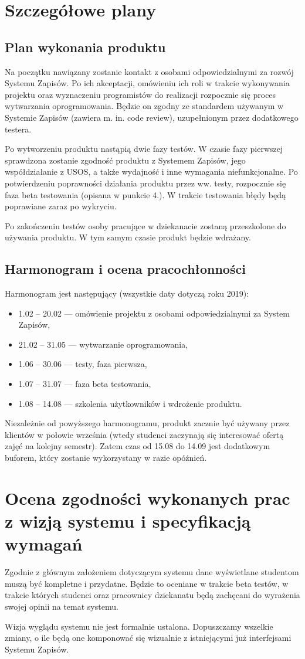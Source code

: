 \documentclass{article}
\begin{document}
\section{Szczegółowe plany}
\subsection{Plan wykonania produktu}
Na początku nawiązany zostanie kontakt z osobami odpowiedzialnymi za rozwój Systemu Zapisów.
Po ich akceptacji, omówieniu ich roli w trakcie wykonywania projektu oraz wyznaczeniu programistów do realizacji rozpocznie się proces wytwarzania oprogramowania.
Będzie on zgodny ze standardem używanym w Systemie Zapisów (zawiera m. in. code review), uzupełnionym przez dodatkowego testera.

Po wytworzeniu produktu nastąpią dwie fazy testów.
W czasie fazy pierwszej sprawdzona zostanie zgodność produktu z Systemem Zapisów, jego współdziałanie z USOS, a także wydajność i inne wymagania niefunkcjonalne.
Po potwierdzeniu poprawności działania produktu przez ww. testy, rozpocznie się faza beta testowania (opisana w punkcie 4.).
W trakcie testowania błędy będą poprawiane zaraz po wykryciu.

Po zakończeniu testów osoby pracujące w dziekanacie zostaną przeszkolone do używania produktu.
W tym samym czasie produkt będzie wdrażany.

\subsection{Harmonogram i ocena pracochłonności}
Harmonogram jest następujący (wszystkie daty dotyczą roku 2019):
\begin{itemize}
 \item 1.02 -- 20.02 --- omówienie projektu z osobami odpowiedzialnymi za System Zapisów,
 \item 21.02 -- 31.05 --- wytwarzanie oprogramowania,
 \item 1.06 -- 30.06 --- testy, faza pierwsza,
 \item 1.07 -- 31.07 --- faza beta testowania,
 \item 1.08 -- 14.08 --- szkolenia użytkowników i wdrożenie produktu.
\end{itemize}
Niezależnie od powyższego harmonogramu, produkt zacznie być używany przez klientów w połowie września (wtedy studenci zaczynają się interesować ofertą zajęć na kolejny semestr).
Zatem czas od 15.08 do 14.09 jest dodatkowym buforem, który zostanie wykorzystany w razie opóźnień.

\section{Ocena zgodności wykonanych prac z wizją systemu i specyfikacją wymagań}
Zgodnie z głównym założeniem dotyczącym systemu dane wyświetlane studentom muszą być kompletne i przydatne.
Będzie to oceniane w trakcie beta testów, w trakcie których studenci oraz pracownicy dziekanatu będą zachęcani do wyrażenia swojej opinii na temat systemu.

Wizja wyglądu systemu nie jest formalnie ustalona.
Dopuszczamy wszelkie zmiany, o ile będą one komponować się wizualnie z istniejącymi już interfejsami Systemu Zapisów.
\end{document}
